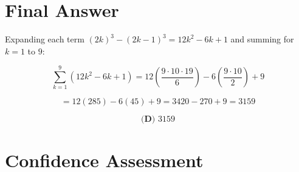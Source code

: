 \documentclass[12pt]{article}
\begin{document}
\section*{Final Answer}

Expanding each term $(2k)^3 - (2k-1)^3 = 12k^2 - 6k + 1$ and summing for $k=1$ to $9$:

$$\sum_{k=1}^{9} (12k^2 - 6k + 1) = 12\left(\frac{9 \cdot 10 \cdot 19}{6}\right) - 6\left(\frac{9 \cdot 10}{2}\right) + 9$$

$$= 12(285) - 6(45) + 9 = 3420 - 270 + 9 = 3159$$

$$\boxed{\textbf{(D) } 3159}$$

\section*{Confidence Assessment}
\end{document}

